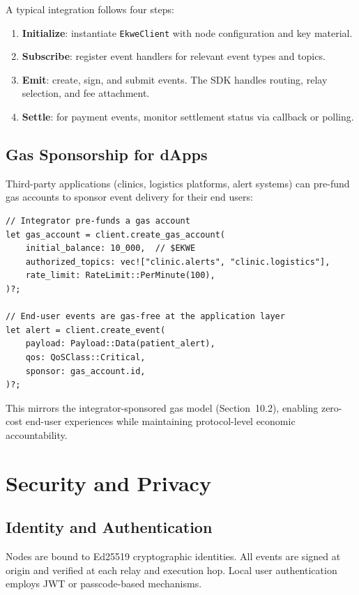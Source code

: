 \documentclass[11pt,a4paper]{article}
\begin{document}
A typical integration follows four steps:
\begin{enumerate}[nosep]
  \item \textbf{Initialize}: instantiate \texttt{EkweClient} with node configuration and key material.
  \item \textbf{Subscribe}: register event handlers for relevant event types and topics.
  \item \textbf{Emit}: create, sign, and submit events. The SDK handles routing, relay selection, and fee attachment.
  \item \textbf{Settle}: for payment events, monitor settlement status via callback or polling.
\end{enumerate}

\subsection{Gas Sponsorship for dApps}

Third-party applications (clinics, logistics platforms, alert systems) can pre-fund gas accounts to sponsor event delivery for their end users:

\begin{lstlisting}[caption={Gas sponsorship example.}]
// Integrator pre-funds a gas account
let gas_account = client.create_gas_account(
    initial_balance: 10_000,  // $EKWE
    authorized_topics: vec!["clinic.alerts", "clinic.logistics"],
    rate_limit: RateLimit::PerMinute(100),
)?;

// End-user events are gas-free at the application layer
let alert = client.create_event(
    payload: Payload::Data(patient_alert),
    qos: QoSClass::Critical,
    sponsor: gas_account.id,
)?;
\end{lstlisting}

This mirrors the integrator-sponsored gas model (Section~10.2), enabling zero-cost end-user experiences while maintaining protocol-level economic accountability.

\section{Security and Privacy}

\subsection{Identity and Authentication}
Nodes are bound to Ed25519 cryptographic identities. All events are signed at origin and verified at each relay and execution hop. Local user authentication employs JWT or passcode-based mechanisms.
\end{document}
